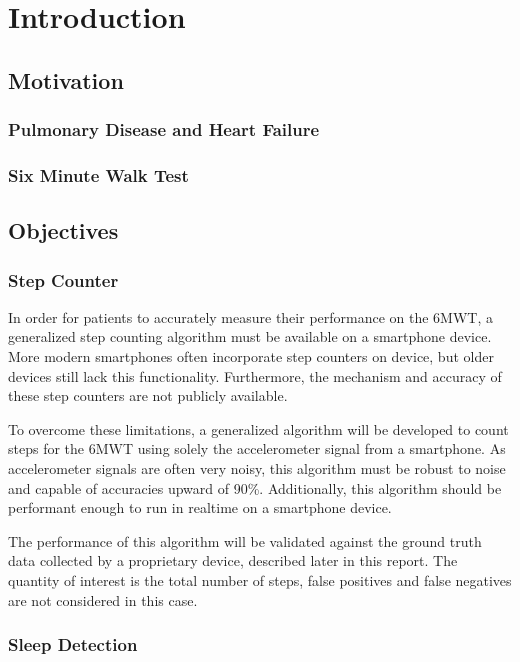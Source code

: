 \part{Introduction}

    \chapter{Motivation}

        \section{Pulmonary Disease and Heart Failure}

        \section{Six Minute Walk Test}

    \chapter{Objectives}

        \section{Step Counter}

            In order for patients to accurately measure their performance on the 6MWT, a generalized step counting algorithm must be available on a smartphone device. More modern smartphones often incorporate step counters on device, but older devices still lack this functionality. Furthermore, the mechanism and accuracy of these step counters are not publicly available. 

            To overcome these limitations, a generalized algorithm will be developed to count steps for the 6MWT using solely the accelerometer signal from a smartphone. As accelerometer signals are often very noisy, this algorithm must be robust to noise and capable of accuracies upward of 90\%. Additionally, this algorithm should be performant enough to run in realtime on a smartphone device.

            The performance of this algorithm will be validated against the ground truth data collected by a proprietary device, described later in this report. The quantity of interest is the total number of steps, false positives and false negatives are not considered in this case.

        \section{Sleep Detection}

